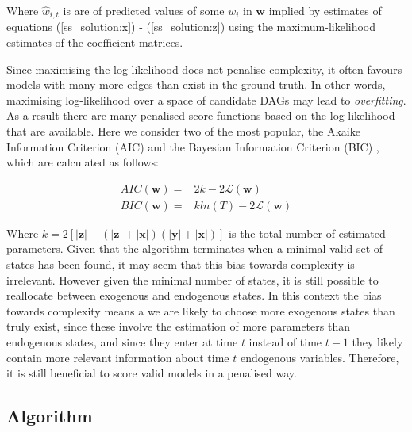 \documentclass{article}
\begin{document}
Where $\hat{w}_{i,t}$ is are of predicted values of some $w_i$ in $\mathbf{w}$ implied by estimates of equations (\ref{ss_solution:x}) - (\ref{ss_solution:z}) using the maximum-likelihood estimates of the coefficient matrices.

Since maximising the log-likelihood does not penalise complexity, it often favours models with many more edges than exist in the ground truth. In other words, maximising log-likelihood over a space of candidate DAGs may lead to \textit{overfitting}. As a result there are many penalised score functions based on the log-likelihood that are available. Here we consider two of the most popular, the Akaike Information Criterion (AIC) \parencite{akaike1974new} and the Bayesian Information Criterion (BIC) \parencite{schwarz1978estimating}, which are calculated as follows:

\begin{align}
  AIC(\mathbf{w}) =& 2k - 2\mathcal{L}(\mathbf{w})\\
  BIC(\mathbf{w}) =& kln(T) - 2\mathcal{L}(\mathbf{w})
\end{align}

Where $k = 2[|\mathbf{z}| + (|\mathbf{z}| + |\mathbf{x}|)(|\mathbf{y}| + |\mathbf{x}|)]$ is the total number of estimated parameters. Given that the algorithm terminates when a minimal valid set of states has been found, it may seem that this bias towards complexity is irrelevant. However given the minimal number of states, it is still possible to reallocate between exogenous and endogenous states. In this context the bias towards complexity means a we are likely to choose more exogenous states than truly exist, since these involve the estimation of more parameters than endogenous states, and since they enter at time $t$ instead of time $t-1$ they likely contain more relevant information about time $t$ endogenous variables. Therefore, it is still beneficial to score valid models in a penalised way.

\subsection{Algorithm} \label{algo}
\end{document}
